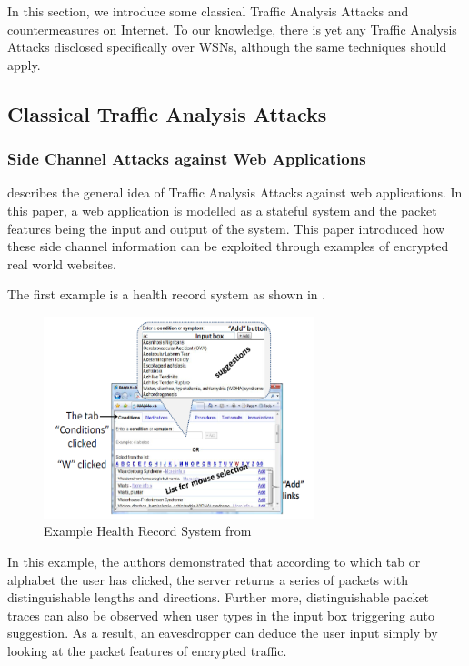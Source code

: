 In this section, we introduce some classical Traffic Analysis Attacks and countermeasures on Internet. To our knowledge, there is yet any Traffic Analysis Attacks disclosed specifically over WSNs, although the same techniques should apply.

\subsection{Classical Traffic Analysis Attacks} \label{Subsec: Traffic Analysis Attacks}

\subsubsection{Side Channel Attacks against Web Applications}

\cite{WebSideChannel} describes the general idea of Traffic Analysis Attacks against web applications. In this paper, a web application is modelled as a stateful system and the packet features being the input and output of the system. This paper introduced how these side channel information can be exploited through examples of encrypted real world websites.

\begin{example}
	The first example is a health record system as shown in .
	
	\begin{figure}[h!]
		\center
		\includegraphics[width=0.7\textwidth]{fig/WebSideChannelExample1.png}
		\caption{Example Health Record System from \cite{WebSideChannel}}
		\label{Fig: HealthRecordSystem}
	\end{figure}
	
	In this example, the authors demonstrated that according to which tab or alphabet the user has clicked, the server returns a series of  packets with distinguishable lengths and directions. Further more, distinguishable packet traces can also be observed when user types in the input box triggering auto suggestion. As a result, an eavesdropper can deduce the user input simply by looking at the packet features of encrypted traffic.
\end{example}

